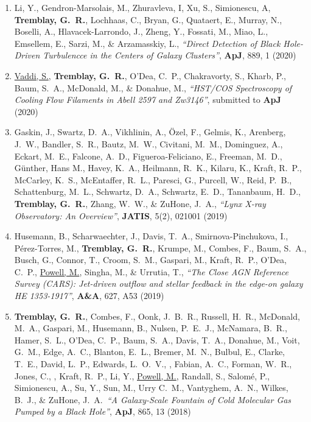 \documentclass[11pt]{article}
\begin{document}
\begin{enumerate}%


\item Li, Y., Gendron-Marsolais, M., Zhuravleva, I, Xu, S.,
Simionescu, A, \textbf{Tremblay, G.~R.}, Lochhaas, C., Bryan, G.,
Quataert, E., Murray, N., Boselli, A., Hlavacek-Larrondo, J.,
Zheng, Y., Fossati, M., Miao, L., Emsellem, E., Sarzi, M.,
\& Arzamasskiy, L., \textit{``Direct Detection of Black Hole-Driven Turbulencce
in the Centers of Galaxy Clusters''}, \textbf{ApJ}, 889, 1 (2020)

\item \uline{Vaddi, S.}, \textbf{Tremblay, G.~R.}, O'Dea, C.~P.,
Chakravorty, S., Kharb, P., Baum, S.~A., McDonald, M., \& Donahue, M.,
\textit{``HST/COS Spectroscopy of Cooling Flow Filaments in Abell 2597 and Zw3146''},
submitted to \textbf{ApJ} (2020)


\item Gaskin, J., Swartz, D.~A., Vikhlinin, A., \"{O}zel, F.,
Gelmis, K., Arenberg, J.~W., Bandler, S.~R., Bautz, M.~W., Civitani, M.~M.,
Dominguez, A., Eckart, M.~E., Falcone, A.~D., Figueroa-Feliciano, E.,
Freeman, M.~D., G\"{u}nther, Hans M., Havey, K.~A., Heilmann, R.~K.,
Kilaru, K., Kraft, R.~P., McCarley, K.~S., McEntaffer, R.~L.,
Paresci, G., Purcell, W., Reid, P.~B., Schattenburg, M.~L.,
Schwartz, D.~A., Schwartz, E.~D., Tananbaum, H.~D.,
\textbf{Tremblay, G.~R.}, Zhang, W.~W., \& ZuHone, J.~A.,
\textit{``Lynx X-ray Observatory: An Overview''}, \textbf{JATIS}, 5(2), 021001 (2019)

\item Husemann, B., Scharwaechter, J., Davis, T.~A., Smirnova-Pinchukova, I., P\'{e}rez-Torres, M., \textbf{Tremblay, G.~R.},
 Krumpe, M., Combes, F., Baum, S.~A., Busch, G., Connor, T.,
 Croom, S.~M., Gaspari, M., Kraft, R.~P., O'Dea, C.~P., \uline{Powell, M.}, Singha, M., \& Urrutia, T., \textit{``The Close AGN Reference Survey (CARS): Jet-driven outflow and stellar feedback in the edge-on galaxy HE 1353-1917''}, \textbf{A\&A}, 627, A53 (2019)

\item \textbf{Tremblay, G.~R.}, Combes, F., Oonk, J.~B.~R., Russell, H.~R., McDonald, M.~A.,
Gaspari, M., Husemann, B., Nulsen, P.~E.~J., McNamara, B.~R., Hamer, S.~L., O'Dea, C.~P.,
Baum, S.~A., Davis, T.~A., Donahue, M., Voit, G.~M., Edge, A.~C., Blanton, E.~L.,
Bremer, M.~N., Bulbul, E., Clarke, T.~E., David, L.~P., Edwards, L.~O.~V., , Fabian, A.~C., Forman, W.~R., Jones, C., , Kraft, R.~P., Li, Y., \uline{Powell, M.},
Randall, S., Salom\'{e}, P., Simionescu, A., Su, Y., Sun, M., Urry C.~M., Vantyghem, A.~N.,
Wilkes, B.~J., \& ZuHone, J.~A.~\textit{``A Galaxy-Scale Fountain of Cold Molecular Gas Pumped by a Black Hole''}, \textbf{ApJ}, 865, 13 (2018)




\end{enumerate}
\end{document}
